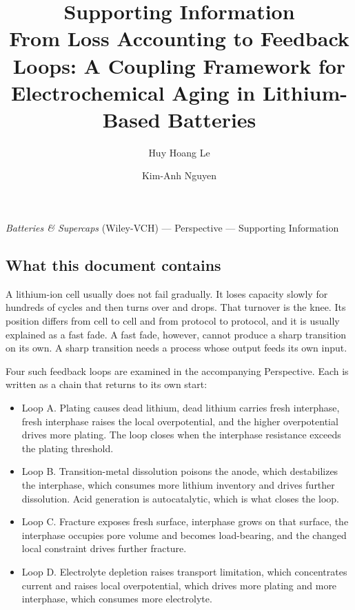 \documentclass[11pt,a4paper]{article}
\title{Supporting Information\\[4pt]
\large From Loss Accounting to Feedback Loops: A Coupling Framework for
Electrochemical Aging in Lithium-Based Batteries}
\author{Huy Hoang Le \and Kim-Anh Nguyen}
\date{}
\begin{document}
\maketitle
\vspace{-1.2em}
\begin{center}
\small \textit{Batteries \& Supercaps} (Wiley-VCH) --- Perspective --- Supporting Information
\end{center}
\medskip



\subsection*{What this document contains}


A lithium-ion cell usually does not fail gradually. It loses capacity slowly for hundreds of cycles and then turns over and drops. That turnover is the knee. Its position differs from cell to cell and from protocol to protocol, and it is usually explained as a fast fade. A fast fade, however, cannot produce a sharp transition on its own. A sharp transition needs a process whose output feeds its own input.


Four such feedback loops are examined in the accompanying Perspective. Each is written as a chain that returns to its own start:


\begin{itemize}
  \item Loop A. Plating causes dead lithium, dead lithium carries fresh interphase, fresh interphase raises the local overpotential, and the higher overpotential drives more plating. The loop closes when the interphase resistance exceeds the plating threshold.
  \item Loop B. Transition-metal dissolution poisons the anode, which destabilizes the interphase, which consumes more lithium inventory and drives further dissolution. Acid generation is autocatalytic, which is what closes the loop.
  \item Loop C. Fracture exposes fresh surface, interphase grows on that surface, the interphase occupies pore volume and becomes load-bearing, and the changed local constraint drives further fracture.
  \item Loop D. Electrolyte depletion raises transport limitation, which concentrates current and raises local overpotential, which drives more plating and more interphase, which consumes more electrolyte.
\end{itemize}
\end{document}
